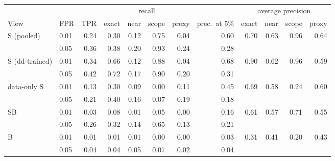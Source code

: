 \begin{tabular}{llrrrrrrrrrr}
\toprule
& & & \multicolumn{4}{c}{recall} & & \multicolumn{4}{c}{average precision}\\ \cmidrule(lr){4-7}\cmidrule(lr){9-12}
View & FPR & TPR & exact & near & scope & proxy & prec.\ at 5\% & exact & near & scope & proxy\\
\midrule
S (pooled) & 0.01 & 0.24 & 0.30 & 0.12 & 0.75 & 0.04 & 0.60 & 0.70 & 0.63 & 0.96 & 0.64\\
 & 0.05 & 0.36 & 0.38 & 0.20 & 0.93 & 0.24 & 0.28 & & & &\\
S (dd-trained) & 0.01 & 0.34 & 0.66 & 0.12 & 0.88 & 0.04 & 0.68 & 0.90 & 0.62 & 0.96 & 0.59\\
 & 0.05 & 0.42 & 0.72 & 0.17 & 0.90 & 0.20 & 0.31 & & & &\\
data-only S & 0.01 & 0.13 & 0.30 & 0.09 & 0.00 & 0.11 & 0.45 & 0.69 & 0.58 & 0.24 & 0.60\\
 & 0.05 & 0.21 & 0.40 & 0.16 & 0.07 & 0.19 & 0.18 & & & &\\
SB & 0.01 & 0.03 & 0.08 & 0.01 & 0.05 & 0.00 & 0.16 & 0.61 & 0.57 & 0.71 & 0.55\\
 & 0.05 & 0.26 & 0.32 & 0.14 & 0.65 & 0.13 & 0.21 & & & &\\
B & 0.01 & 0.01 & 0.01 & 0.01 & 0.00 & 0.00 & 0.03 & 0.31 & 0.41 & 0.20 & 0.43\\
 & 0.05 & 0.04 & 0.04 & 0.05 & 0.07 & 0.02 & 0.04 & & & &\\
\bottomrule
\end{tabular}

